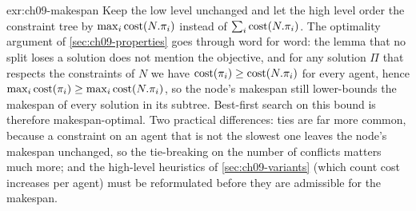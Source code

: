 \begin{solution}{exr:ch09-makespan}
Keep the low level unchanged and let the high level order the constraint tree
by $\max_i \operatorname{cost}(N.\pi_i)$ instead of $\sum_i \operatorname{cost}(N.\pi_i)$. The optimality
argument of \cref{sec:ch09-properties} goes through word for word: the
lemma that no split loses a solution does not mention the objective, and for
any solution $\Pi$ that respects the constraints of $N$ we have
$\operatorname{cost}(\pi_i) \ge \operatorname{cost}(N.\pi_i)$ for every agent, hence
$\max_i \operatorname{cost}(\pi_i) \ge \max_i \operatorname{cost}(N.\pi_i)$, so the node's makespan still
lower-bounds the makespan of every solution in its subtree. Best-first search
on this bound is therefore makespan-optimal. Two practical differences: ties
are far more common, because a constraint on an agent that is not the
slowest one leaves the node's makespan unchanged, so the tie-breaking on the
number of conflicts matters much more; and the high-level heuristics of
\cref{sec:ch09-variants} (which count cost increases per agent) must be
reformulated before they are admissible for the makespan.
\end{solution}
